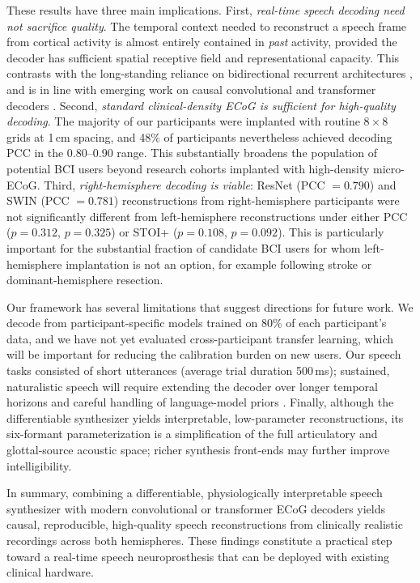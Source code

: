 \documentclass[11pt]{article}
\begin{document}
These results have three main implications. First, \emph{real-time speech decoding need not sacrifice quality}. The temporal context needed to reconstruct a speech frame from cortical activity is almost entirely contained in \emph{past} activity, provided the decoder has sufficient spatial receptive field and representational capacity. This contrasts with the long-standing reliance on bidirectional recurrent architectures \cite{anumanchipalli2019speech,makin2020machine}, and is in line with emerging work on causal convolutional and transformer decoders \cite{metzger2023highperformance,willett2023highperformance,berezutskaya2023direct}. Second, \emph{standard clinical-density ECoG is sufficient for high-quality decoding}. The majority of our participants were implanted with routine $8\times 8$ grids at 1\,cm spacing, and 48\% of participants nevertheless achieved decoding PCC in the 0.80--0.90 range. This substantially broadens the population of potential BCI users beyond research cohorts implanted with high-density micro-ECoG. Third, \emph{right-hemisphere decoding is viable}: ResNet (PCC $= 0.790$) and SWIN (PCC $= 0.781$) reconstructions from right-hemisphere participants were not significantly different from left-hemisphere reconstructions under either PCC ($p = 0.312$, $p = 0.325$) or STOI+ ($p = 0.108$, $p = 0.092$). This is particularly important for the substantial fraction of candidate BCI users for whom left-hemisphere implantation is not an option, for example following stroke or dominant-hemisphere resection.

Our framework has several limitations that suggest directions for future work. We decode from participant-specific models trained on 80\% of each participant's data, and we have not yet evaluated cross-participant transfer learning, which will be important for reducing the calibration burden on new users. Our speech tasks consisted of short utterances (average trial duration 500\,ms); sustained, naturalistic speech will require extending the decoder over longer temporal horizons and careful handling of language-model priors \cite{willett2023highperformance,metzger2023highperformance}. Finally, although the differentiable synthesizer yields interpretable, low-parameter reconstructions, its six-formant parameterization is a simplification of the full articulatory and glottal-source acoustic space; richer synthesis front-ends may further improve intelligibility.

In summary, combining a differentiable, physiologically interpretable speech synthesizer with modern convolutional or transformer ECoG decoders yields causal, reproducible, high-quality speech reconstructions from clinically realistic recordings across both hemispheres. These findings constitute a practical step toward a real-time speech neuroprosthesis that can be deployed with existing clinical hardware.



\end{document}
